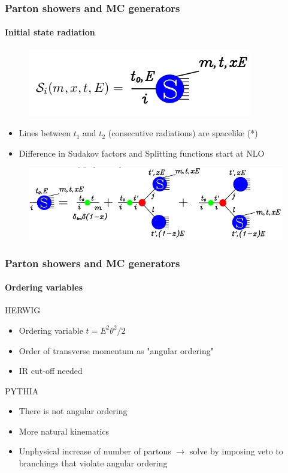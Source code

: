 \documentclass[aspectratio=43]{beamer}
\begin{document}
\begin{frame}

	\frametitle{Parton showers and MC generators}
	\framesubtitle{Initial state radiation}
	
	\begin{figure}
		\includegraphics[width = 5.5 cm]{plots/shower_ISR_2.png}
	\end{figure}
	
	\begin{itemize} 
		\item Lines between $t_{1}$ and $t_{2}$ (consecutive radiations) are spacelike {\color{blue}(*)}
		\item Difference in Sudakov factors and Splitting functions start at NLO
	\end{itemize}
	
	\begin{figure}
		\includegraphics[width = 10 cm]{plots/shower_ISR_3.png}
	\end{figure}

\end{frame}

\begin{frame}

	\frametitle{Parton showers and MC generators}
	\framesubtitle{Ordering variables}
	
	HERWIG
	\begin{itemize} 
		\item Ordering variable $t = E^{2}\theta^{2}/2$
		\item Order of transverse momentum as "angular ordering"
		\item IR cut-off needed
	\end{itemize}

	PYTHIA
	\begin{itemize} 
		\item There is not angular ordering
		\item More natural kinematics
		\item Unphysical increase of number of partons $\longrightarrow$ solve by imposing veto to branchings that violate angular ordering
	\end{itemize}

\end{frame}
\end{document}
